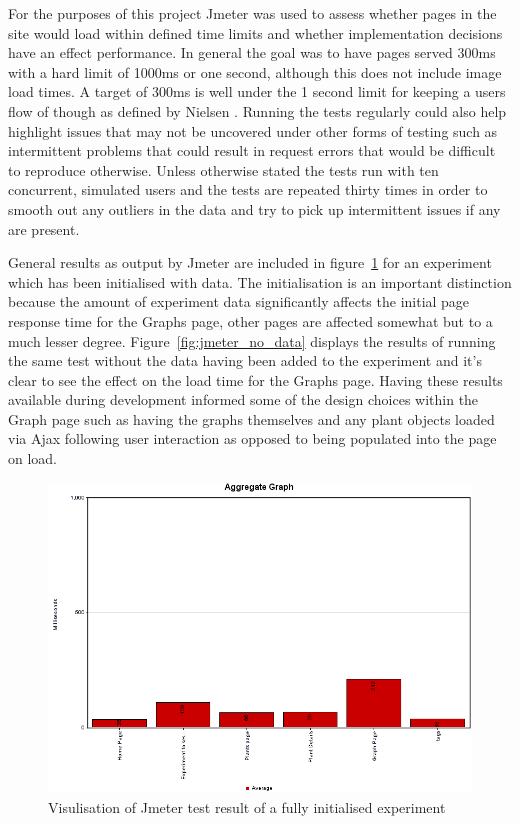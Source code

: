 For the purposes of this project Jmeter was used to assess whether pages in the site would load within defined time limits and whether implementation decisions have an effect performance. In general the goal was to have pages served 300ms with a hard limit of 1000ms or one second, although this does not include image load times. A target of 300ms is well under the 1 second limit for keeping a users flow of though as defined by Nielsen \cite{responseTimes}.
Running the tests regularly could also help highlight issues that may not be uncovered under other forms of testing such as intermittent problems that could result in request errors that would be difficult to reproduce otherwise. Unless otherwise stated the tests run with ten concurrent, simulated users and the tests are repeated thirty times in order to smooth out any outliers in the data and try to pick up intermittent issues if any are present.

General results as output by Jmeter are included in figure~\ref{fig:jmeter_with_data} for an experiment which has been initialised with data. The initialisation is an important distinction because the amount of experiment data significantly affects the initial page response time for the Graphs page, other pages are affected somewhat but to a much lesser degree. Figure~\ref{fig:jmeter_no_data} displays the results of running the same test without the data having been added to the experiment and it's clear to see the effect on the load time for the Graphs page. Having these results available during development informed some of the design choices within the Graph page such as having the graphs themselves and any plant objects loaded via Ajax following user interaction as opposed to being populated into the page on load.
\begin{figure}[H]
    \centering
    \includegraphics[width=\textwidth]{images/testing/jmeter_final}
    \caption{Visulisation of Jmeter test result of a fully initialised experiment}
    \label{fig:jmeter_with_data}
\end{figure} 

